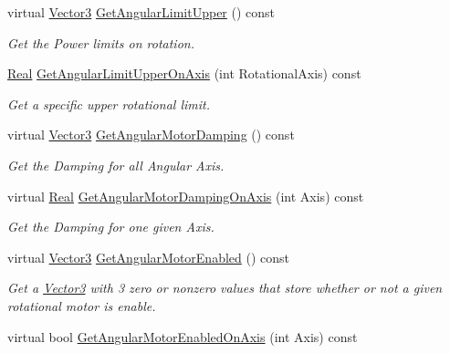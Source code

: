 \begin{DoxyCompactItemize}
virtual \hyperlink{classphys_1_1Vector3}{Vector3} \hyperlink{classphys_1_1Generic6DofConstraint_a405317ca2a5a6d9186f2278d70c84750}{GetAngularLimitUpper} () const 
\begin{DoxyCompactList}\small\item\em Get the Power limits on rotation. \item\end{DoxyCompactList}\item 
\hyperlink{namespacephys_af7eb897198d265b8e868f45240230d5f}{Real} \hyperlink{classphys_1_1Generic6DofConstraint_aba692acb2466c538dae6f8105f64f623}{GetAngularLimitUpperOnAxis} (int RotationalAxis) const 
\begin{DoxyCompactList}\small\item\em Get a specific upper rotational limit. \item\end{DoxyCompactList}\item 
virtual \hyperlink{classphys_1_1Vector3}{Vector3} \hyperlink{classphys_1_1Generic6DofConstraint_a1784ace37ce04abece18fd570dab8ba3}{GetAngularMotorDamping} () const 
\begin{DoxyCompactList}\small\item\em Get the Damping for all Angular Axis. \item\end{DoxyCompactList}\item 
virtual \hyperlink{namespacephys_af7eb897198d265b8e868f45240230d5f}{Real} \hyperlink{classphys_1_1Generic6DofConstraint_a0ec798d4675ba2c6bffd53489d8be48e}{GetAngularMotorDampingOnAxis} (int Axis) const 
\begin{DoxyCompactList}\small\item\em Get the Damping for one given Axis. \item\end{DoxyCompactList}\item 
virtual \hyperlink{classphys_1_1Vector3}{Vector3} \hyperlink{classphys_1_1Generic6DofConstraint_aafe2ede986cdd2bf37f826578c9d137c}{GetAngularMotorEnabled} () const 
\begin{DoxyCompactList}\small\item\em Get a \hyperlink{classphys_1_1Vector3}{Vector3} with 3 zero or nonzero values that store whether or not a given rotational motor is enable. \item\end{DoxyCompactList}\item 
virtual bool \hyperlink{classphys_1_1Generic6DofConstraint_a6292d44a48b5e94a1afc21f4649cd895}{GetAngularMotorEnabledOnAxis} (int Axis) const 

\end{DoxyCompactItemize}
